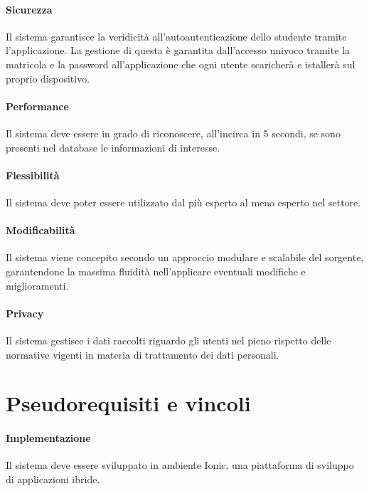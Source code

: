 \paragraph{Sicurezza \\} 
Il sistema garantisce la veridicità all’autoautenticazione dello studente tramite l’applicazione. La gestione di questa è garantita dall’accesso univoco tramite la matricola e la password all’applicazione che ogni utente scaricherà e istallerà sul proprio dispositivo.

\paragraph{Performance \\} 
Il sistema deve essere in grado di riconoscere, all’incirca in 5 secondi, se sono presenti nel database le informazioni di interesse.

\paragraph{Flessibilità \\}
Il sistema deve poter essere utilizzato dal più esperto al meno esperto nel settore.

\paragraph{Modificabilità \\}
Il sistema viene concepito secondo un approccio modulare e scalabile del sorgente, garantendone la massima fluidità nell'applicare eventuali modifiche e miglioramenti.

\paragraph{Privacy \\}
Il sistema gestisce i dati raccolti riguardo gli utenti nel pieno rispetto delle normative vigenti in materia di trattamento dei dati personali.

\section{Pseudorequisiti e vincoli}

\paragraph{Implementazione \\}
Il sistema deve essere sviluppato in ambiente Ionic, una piattaforma di sviluppo di applicazioni ibride.


\clearpage